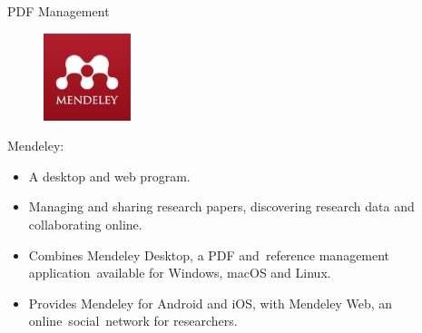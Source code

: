 \documentclass[
 size=14pt,
 paper=smartboard,  %
 mode=present, 		%
 display=slides, 	%
 style=tuliplab,  	%
 pauseslide,
 fleqn,leqno]{powerdot}{}
\begin{document}
\begin{slide}{PDF Management}

\begin{figure}
  \centering
  \includegraphics[width=1in]{figures/Mendeley_Logo.eps}\\
\end{figure}

Mendeley:

\begin{itemize}
  \item A desktop and web program.
  \item Managing and sharing research papers, discovering research data and collaborating online.
  \item Combines Mendeley Desktop, a PDF and reference management application available for Windows, macOS and Linux.
  \item Provides Mendeley for Android and iOS, with Mendeley Web, an online social network for researchers.
\end{itemize}

\end{slide}
\end{document}

